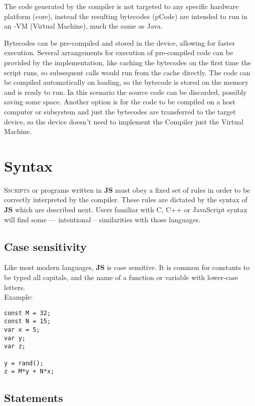 The code generated by the compiler is not targeted to any specific hardware platform (core), instead the resulting bytecodes (pCode) are intended to run in an \uJS-VM (Virtual Machine), much the same as Java. 

Bytecodes can be pre-compiled and stored in the device, allowing for faster execution. Several arrangements for execution of pre-compiled code can be provided by the implementation, like caching the bytecodes on the first time the script runs, so subsequent calls would run from the cache directly. The code can be compiled automatically on loading, so the bytecode is stored on the memory and is ready to run. In this scenario the source code can be discarded, possibly saving some space. Another option is for the code to be compiled on a host computer or subsystem and just the bytecodes are transferred to the target device, so the device doesn't need to implement the \uJS Compiler just the Virtual Machine.

\section {Syntax}

\lettrine{S}{scripts} or programs written in \textbf{\textmu JS} must obey a fixed set of rules in order to be correctly interpreted by the compiler. These rules are dictated by the syntax of \textbf{\textmu JS} which are described next. Users familiar with C, C++ or JavaScript syntax will find some --- intentional -- similarities with those languages.

\subsection{Case sensitivity}

Like most modern languages, \textbf{\textmu JS} is case sensitive. It is common for constants to be typed all capitals, and the name of a function or variable with lower-case letters.\\

Example:
\begin{lstlisting}[language=uJS]
const M = 32;
const N = 15;
var x = 5;
var y;
var z;

y = rand();
z = M*y + N*x;
\end{lstlisting}

\subsection{Statements}

